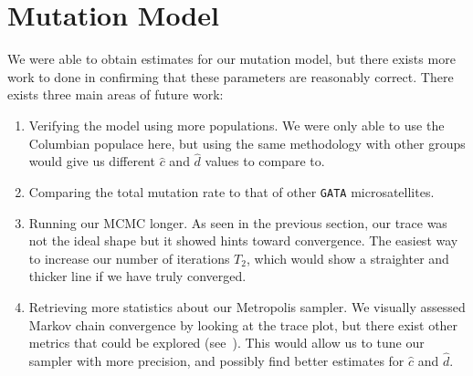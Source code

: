 \section{Mutation Model}\label{sec:mutationModel}
We were able to obtain estimates for our mutation model, but there exists more work to done in confirming that these
parameters are reasonably correct.
There exists three main areas of future work:
\begin{enumerate}
    \item Verifying the model using more populations.
        We were only able to use the Columbian populace here, but using the same methodology with other groups would
        give us different $\hat{c}$ and $\hat{d}$ values to compare to.
    \item Comparing the total mutation rate to that of other \texttt{GATA} microsatellites.
    \item Running our MCMC longer.
        As seen in the previous section, our trace was not the ideal shape but it showed hints toward convergence.
        The easiest way to increase our number of iterations $T_2$, which would show a straighter and thicker line if
        we have truly converged.
    \item Retrieving more statistics about our Metropolis sampler.
        We visually assessed Markov chain convergence by looking at the trace plot, but there exist other metrics
        that could be explored (see~\cite{cowlesMarkovChainMonte1996}).
        This would allow us to tune our sampler with more precision, and possibly find better estimates for $\hat{c}$
        and $\hat{d}$.
\end{enumerate}

